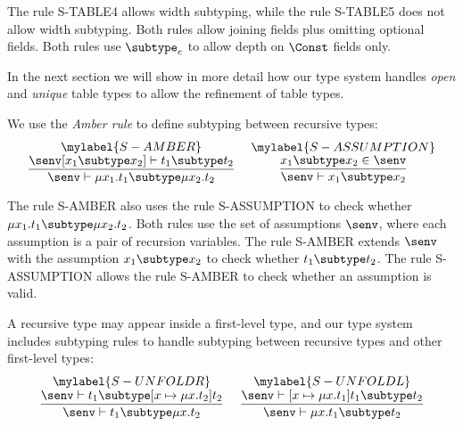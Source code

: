 The rule \textsc{S-TABLE4} allows width subtyping, while
the rule \textsc{S-TABLE5} does not allow width subtyping.
Both rules allow joining fields plus omitting optional fields.
Both rules use $\subtype_{c}$ to allow depth on $\Const$ fields only.

In the next section we will show in more detail how our type system
handles \emph{open} and \emph{unique} table types to allow the refinement of
table types.

We use the \emph{Amber rule} \citep{cardelli1986amber} to define
subtyping between recursive types:
\[
\begin{array}{c}
\begin{array}{c}
\mylabel{S-AMBER}\\
\dfrac{\senv[x_{1} \subtype x_{2}] \vdash t_{1} \subtype t_{2}}
      {\senv \vdash \mu x_{1}.t_{1} \subtype \mu x_{2}.t_{2}}
\end{array}
\;
\begin{array}{c}
\mylabel{S-ASSUMPTION}\\
\dfrac{x_{1} \subtype x_{2} \in \senv}
      {\senv \vdash x_{1} \subtype x_{2}}
\end{array}
\end{array}
\]

The rule \textsc{S-AMBER} also uses the rule \textsc{S-ASSUMPTION}
to check whether $\mu x_{1}.t_{1} \subtype \mu x_{2}.t_{2}$.
Both rules use the set of assumptions $\senv$,
where each assumption is a pair of recursion variables.
The rule \textsc{S-AMBER} extends $\senv$ with the assumption
$x_{1} \subtype x_{2}$ to check whether $t_{1} \subtype t_{2}$.
The rule \textsc{S-ASSUMPTION} allows the rule \textsc{S-AMBER}
to check whether an assumption is valid.

A recursive type may appear inside a first-level type, and our
type system includes subtyping rules to handle subtyping between
recursive types and other first-level types:
\[
\begin{array}{c}
\begin{array}{c}
\mylabel{S-UNFOLDR}\\
\dfrac{\senv \vdash t_{1} \subtype [x \mapsto \mu x.t_{2}]t_{2}}
      {\senv \vdash t_{1} \subtype \mu x.t_{2}}
\end{array}
\;
\begin{array}{c}
\mylabel{S-UNFOLDL}\\
\dfrac{\senv \vdash [x \mapsto \mu x.t_{1}]t_{1} \subtype t_{2}}
      {\senv \vdash \mu x.t_{1} \subtype t_{2}}
\end{array}
\end{array}
\]

